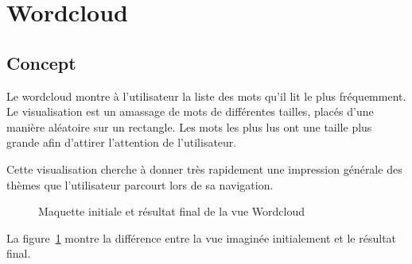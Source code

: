 
\section{Wordcloud}

	\subsection{Concept}

		Le wordcloud montre à l'utilisateur la liste des mots qu'il lit le plus fréquemment. Le visualisation est un amassage de mots de différentes tailles, placés d'une manière aléatoire sur un rectangle. Les mots les plus lus ont une taille plus grande afin d'attirer l'attention de l'utilisateur.

		Cette visualisation cherche à donner très rapidement une impression générale des thèmes que l'utilisateur parcourt lors de sa navigation.

		\begin{figure}[!h]
			\centering
			\caption{Maquette initiale et résultat final de la vue Wordcloud}
			\label{wordcloud_images}
		\end{figure}

		La figure~\ref{wordcloud_images} montre la différence entre la vue imaginée initialement et le résultat final.

